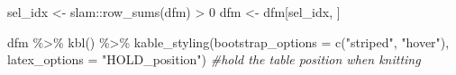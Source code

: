 \documentclass[
]{article}
\newenvironment{Shaded}{\begin{snugshade}}{\end{snugshade}}
\newcommand{\AttributeTok}[1]{\textcolor[rgb]{0.77,0.63,0.00}{#1}}
\newcommand{\CommentTok}[1]{\textcolor[rgb]{0.56,0.35,0.01}{\textit{#1}}}
\newcommand{\DecValTok}[1]{\textcolor[rgb]{0.00,0.00,0.81}{#1}}
\newcommand{\FunctionTok}[1]{\textcolor[rgb]{0.00,0.00,0.00}{#1}}
\newcommand{\NormalTok}[1]{#1}
\newcommand{\OtherTok}[1]{\textcolor[rgb]{0.56,0.35,0.01}{#1}}
\newcommand{\SpecialCharTok}[1]{\textcolor[rgb]{0.00,0.00,0.00}{#1}}
\newcommand{\StringTok}[1]{\textcolor[rgb]{0.31,0.60,0.02}{#1}}
\begin{document}
\begin{Shaded}
\begin{Highlighting}[]
\NormalTok{sel\_idx }\OtherTok{\textless{}{-}}\NormalTok{ slam}\SpecialCharTok{::}\FunctionTok{row\_sums}\NormalTok{(dfm) }\SpecialCharTok{\textgreater{}} \DecValTok{0} 
\NormalTok{dfm }\OtherTok{\textless{}{-}}\NormalTok{ dfm[sel\_idx, ]}

\NormalTok{dfm }\SpecialCharTok{\%\textgreater{}\%} 
  \FunctionTok{kbl}\NormalTok{() }\SpecialCharTok{\%\textgreater{}\%} 
  \FunctionTok{kable\_styling}\NormalTok{(}\AttributeTok{bootstrap\_options =} \FunctionTok{c}\NormalTok{(}\StringTok{"striped"}\NormalTok{, }\StringTok{"hover"}\NormalTok{),}
                \AttributeTok{latex\_options =} \StringTok{"HOLD\_position"}\NormalTok{) }\CommentTok{\#hold the table position when knitting}
\end{Highlighting}
\end{Shaded}
\end{document}
